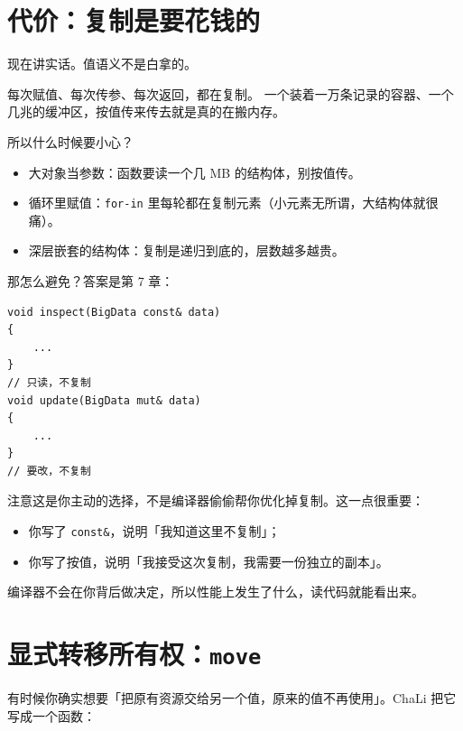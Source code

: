 \section{代价：复制是要花钱的}

现在讲实话。值语义不是白拿的。

每次赋值、每次传参、每次返回，都在复制。 一个装着一万条记录的容器、一个几兆的缓冲区，按值传来传去就是真的在搬内存。

所以什么时候要小心？

\begin{itemize}

\item 大对象当参数：函数要读一个几 MB 的结构体，别按值传。

\item 循环里赋值：\texttt{for-in} 里每轮都在复制元素（小元素无所谓，大结构体就很痛）。

\item 深层嵌套的结构体：复制是递归到底的，层数越多越贵。

\end{itemize}

那怎么避免？答案是第 7 章：

\par
\medskip
\begin{lstlisting}[style=chali]
void inspect(BigData const& data)
{
    ...
}
// 只读，不复制
void update(BigData mut& data)
{
    ...
}
// 要改，不复制
\end{lstlisting}
\par
\medskip

注意这是你主动的选择，不是编译器偷偷帮你优化掉复制。这一点很重要：

\begin{itemize}

\item 你写了 \texttt{const\&}，说明「我知道这里不复制」；

\item 你写了按值，说明「我接受这次复制，我需要一份独立的副本」。

\end{itemize}

编译器不会在你背后做决定，所以性能上发生了什么，读代码就能看出来。

\section{显式转移所有权：\texttt{move}}

有时候你确实想要「把原有资源交给另一个值，原来的值不再使用」。ChaLi 把它写成一个函数：

